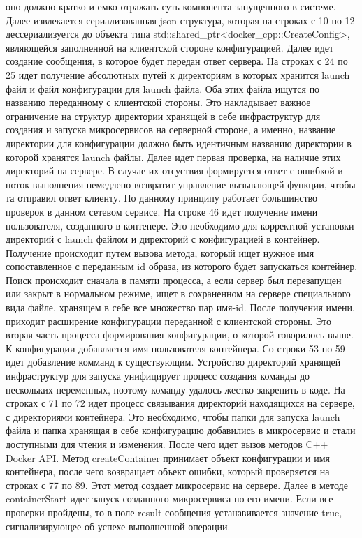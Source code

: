 \documentclass[a4paper, 14pt]{extreport}
\begin{document}
оно должно кратко и емко отражать суть компонента запущенного в системе. Далее извлекается сериализованная json структура, которая на 
строках с 10 по 12 дессериализуется до объекта типа std::shared\_ptr<docker\_cpp::CreateConfig>, являющейся заполненной на клиентской 
стороне конфигурацией. Далее идет создание сообщения, в которое будет передан ответ сервера. На строках с 24 по 25 идет получение 
абсолютных путей к директориям в которых хранится launch файл и файл конфигурации для launch файла. Оба этих файла ищутся по названию 
переданному с клиентской стороны. Это накладывает важное ограничение на структур директории хранящей в себе инфраструктур для создания 
и запуска микросервисов на серверной стороне, а именно, название директории для конфигурации должно быть идентичным названию директории 
в которой хранятся launch файлы. Далее идет первая проверка, на наличие этих директорий на сервере. В случае их отсуствия формируется 
ответ с ошибкой и поток выполнения немедлено возвратит управление вызывающей функции, чтобы та отправил ответ клиенту. По данному принципу 
работает большинство проверок в данном сетевом сервисе. На строке 46 идет получение имени пользователя, созданного в контенере. Это 
необходимо для корректной установки директорий с launch файлом и директорий с конфигурацией в контейнер. Получение происходит путем 
вызова метода, который ищет нужное имя сопоставленное с переданным id образа, из которого будет запускаться контейнер. Поиск происходит 
сначала в памяти процесса, а если сервер был перезапущен или закрыт в нормальном режиме, ищет в сохраненном на сервере специального вида 
файле, хранящем в себе все множество пар имя-id. После получения имени, приходит расширение конфигурации переданной с клиентской стороны.
Это вторая часть процесса формирования конфигурации, о которой говорилось выше. К конфигурации добавляется имя пользователя контейнера.
Со строки 53 по 59 идет добавление комманд к существующим. Устройство директорий хранящей инфраструктур для запуска унифицирует процесс 
создания команды до нескольких переменных, поэтому команду удалось жестко закрепить в коде. На строках с 71 по 72 идет процесс связывания 
директорий находящихся на сервере, с директориями контейнера. Это необходимо, чтобы папки для запуска launch файла и папка хранящая в 
себе конфигурацию добавились в микросервис и стали доступными для чтения и изменения. После чего идет вызов методов C++ Docker API.
Метод createContainer принимает объект конфигурации и имя контейнера, после чего возвращает объект ошибки, который проверяется на 
строках с 77 по 89. Этот метод создает микросервис на сервере. Далее в методе containerStart идет запуск созданного микросервиса по его 
имени. Если все проверки пройдены, то в поле result сообщения устанавивается значение true, сигнализирующее об успехе выполненной 
операции.
\end{document}
